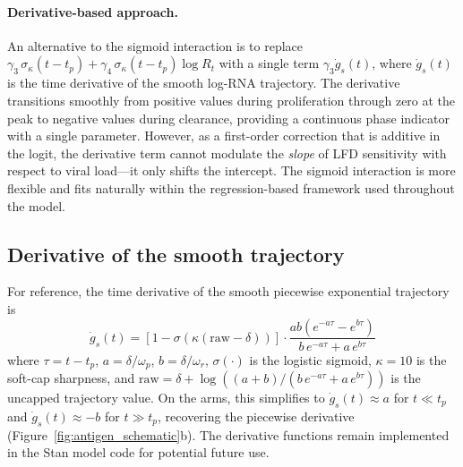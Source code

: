 \begin{appendix}
\paragraph{Derivative-based approach.} An alternative to the sigmoid interaction is to replace $\gamma_3 \,\sigma_\kappa(t - t_p) + \gamma_4 \,\sigma_\kappa(t - t_p) \log R_t$ with a single term $\gamma_3 \dot{g}_s(t)$, where $\dot{g}_s(t)$ is the time derivative of the smooth log-RNA trajectory. The derivative transitions smoothly from positive values during proliferation through zero at the peak to negative values during clearance, providing a continuous phase indicator with a single parameter. However, as a first-order correction that is additive in the logit, the derivative term cannot modulate the \emph{slope} of LFD sensitivity with respect to viral load---it only shifts the intercept. The sigmoid interaction is more flexible and fits naturally within the regression-based framework used throughout the model.

\subsection{Derivative of the smooth trajectory}

For reference, the time derivative of the smooth piecewise exponential trajectory is
\begin{equation*}
    \dot{g}_s(t) = \left[1 - \sigma\!\left(\kappa(\text{raw} - \delta)\right)\right] \cdot \frac{ab\left(e^{-a\tau} - e^{b\tau}\right)}{b\,e^{-a\tau} + a\,e^{b\tau}}
\end{equation*}
where $\tau = t - t_p$, $a = \delta/\omega_p$, $b = \delta/\omega_r$, $\sigma(\cdot)$ is the logistic sigmoid, $\kappa = 10$ is the soft-cap sharpness, and $\text{raw} = \delta + \log\!\left((a+b)/(b\,e^{-a\tau} + a\,e^{b\tau})\right)$ is the uncapped trajectory value. On the arms, this simplifies to $\dot{g}_s(t) \approx a$ for $t \ll t_p$ and $\dot{g}_s(t) \approx -b$ for $t \gg t_p$, recovering the piecewise derivative (Figure~\ref{fig:antigen_schematic}b). The derivative functions remain implemented in the Stan model code for potential future use.


\end{appendix}
